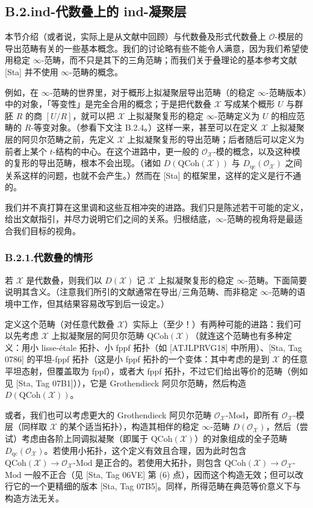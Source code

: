 \subsection*{B.2.\quad ind-代数叠上的 ind-凝聚层}
本节介绍（或者说，实际上是从文献中回顾）与代数叠及形式代数叠上 $\mathcal O$-模层的导出范畴有关的一些基本概念。我们的讨论略有些不能令人满意，因为我们希望使用稳定 $\infty$-范畴，而不只是其下的三角范畴；而我们关于叠理论的基本参考文献 [Sta] 并不使用 $\infty$-范畴的概念。

例如，在 $\infty$-范畴的世界里，对于概形上拟凝聚层导出范畴（的稳定 $\infty$-范畴版本）中的对象，「等变性」是完全合用的概念；于是把代数叠 $\mathcal X$ 写成某个概形 $U$ 与群胚 $R$ 的商 $[U/R]$，就可以把 $\mathcal X$ 上拟凝聚复形的稳定 $\infty$-范畴定义为 $U$ 的相应范畴的 $R$-等变对象。（参看下文注 B.2.4。）这样一来，甚至可以在定义 $\mathcal X$ 上拟凝聚层的阿贝尔范畴之前，先定义 $\mathcal X$ 上拟凝聚复形的导出范畴；后者随后可以定义为前者上某个 $t$-结构的中心。在这个进路中，更一般的 $\mathcal O_{\mathcal X}$-模的概念，以及这种模的复形的导出范畴，根本不会出现。（诸如 $D(\mathrm{QCoh}(\mathcal X))$ 与 $D_{\mathrm{qc}}(\mathcal O_{\mathcal X})$ 之间关系这样的问题，也就不会产生。）然而在 [Sta] 的框架里，这样的定义是行不通的。

我们并不真打算在这里调和这些互相冲突的进路。我们只是陈述若干可能的定义，给出文献指引，并尽力说明它们之间的关系。归根结底，$\infty$-范畴的视角将是最适合我们目标的视角。

\subsubsection*{B.2.1.\quad 代数叠的情形}
若 $\mathcal X$ 是代数叠，则我们以 $D(\mathcal X)$ 记 $\mathcal X$ 上拟凝聚复形的稳定 $\infty$-范畴。下面简要说明其含义。（注意我们所引的文献通常在导出/三角范畴、而非稳定 $\infty$-范畴的语境中工作，但其结果容易改写到后一设定。）

定义这个范畴（对任意代数叠 $\mathcal X$）实际上（至少！）有两种可能的进路：我们可以先考虑 $\mathcal X$ 上拟凝聚层的阿贝尔范畴 $\mathrm{QCoh}(\mathcal X)$（就连这个范畴也有多种定义：用小 lisse-étale 拓扑、小 fppf 拓扑（如 [ATJLPRVG18] 中所用）、[Sta, Tag 0786] 的平坦-fppf 拓扑（这是小 fppf 拓扑的一个变体：其中考虑的是到 $\mathcal X$ 的任意平坦态射，但覆盖取为 fppf），或者大 fppf 拓扑，不过它们给出等价的范畴（例如见 [Sta, Tag 07B1]）），它是 Grothendieck 阿贝尔范畴，然后构造 $D(\mathrm{QCoh}(\mathcal X))$。

或者，我们也可以考虑更大的 Grothendieck 阿贝尔范畴 $\mathcal O_{\mathcal X}$-$\mathrm{Mod}$，即所有 $\mathcal O_{\mathcal X}$-模层（同样取 $\mathcal X$ 的某个适当拓扑），构造其相伴的稳定 $\infty$-范畴 $D(\mathcal O_{\mathcal X})$，然后（尝试）考虑由各阶上同调拟凝聚（即属于 $\mathrm{QCoh}(\mathcal X)$）的对象组成的全子范畴 $D_{\mathrm{qc}}(\mathcal O_{\mathcal X})$。若使用小拓扑，这个定义有效且合理，因为此时包含 $\mathrm{QCoh}(\mathcal X)\to\mathcal O_{\mathcal X}$-$\mathrm{Mod}$ 是正合的。若使用大拓扑，则包含 $\mathrm{QCoh}(\mathcal X)\to\mathcal O_{\mathcal X}$-$\mathrm{Mod}$ 一般不正合（见 [Sta, Tag 06VE] 第 (6) 点），因而这个构造无效；但可以改行它的一个更精细的版本 [Sta, Tag 07B5]。同样，所得范畴在典范等价意义下与构造方法无关。

